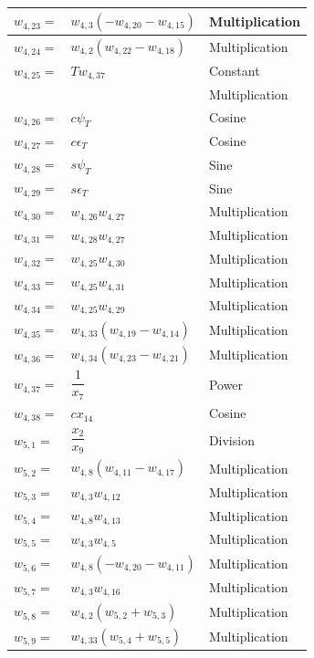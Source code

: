\begin{longtable}{|p{1.5cm}|l|p{2cm}|}
$w_{4,23}=$ & $ w_{4,3}\left(-w_{4,20}-w_{4,15}\right) $ &  Multiplication \\ \hline
$w_{4,24}=$ & $ w_{4,2}\left(w_{4,22}-w_{4,18}\right) $ &  Multiplication \\ \hline
$w_{4,25}=$  & $ T w_{4,37} $ & Constant  \\ 
& & Multiplication \\ \hline
$w_{4,26}=$  & $ c\psi_{T}  $ & Cosine  \\ \hline
$w_{4,27}=$  & $ c\epsilon_{T}  $ & Cosine  \\ \hline
$w_{4,28}=$  & $ s\psi_{T}  $ & Sine  \\ \hline
$w_{4,29}=$  & $ s\epsilon_{T}  $ & Sine  \\ \hline
$w_{4,30}=$ & $ w_{4,26}w_{4,27} $ &  Multiplication \\ \hline
$w_{4,31}=$ & $ w_{4,28}w_{4,27} $ &  Multiplication \\ \hline
$w_{4,32}=$ & $ w_{4,25}w_{4,30} $ &  Multiplication \\ \hline
$w_{4,33}=$ & $ w_{4,25}w_{4,31} $ &  Multiplication \\ \hline
$w_{4,34}=$ & $ w_{4,25}w_{4,29} $ &  Multiplication \\ \hline
$w_{4,35}=$ & $ w_{4,33}\left(w_{4,19}-w_{4,14}\right) $ &  Multiplication \\ \hline
$w_{4,36}=$ & $ w_{4,34}\left(w_{4,23}-w_{4,21}\right) $ &  Multiplication \\ \hline
$w_{4,37}=$  & $ \dfrac{1}{x_{7}} $ & Power \\ \hline
$w_{4,38}=$  & $ cx_{14}  $ & Cosine  \\ \hline
$w_{5,1}=$ & $ \dfrac{x_{2}}{x_{9}} $ & Division  \\ \hline
$w_{5,2}=$ & $ w_{4,8}\left(w_{4,11}-w_{4,17}\right) $ & Multiplication  \\ \hline
$w_{5,3}=$ & $ w_{4,3}w_{4,12} $ & Multiplication \\ \hline
$w_{5,4}=$ & $ w_{4,8}w_{4,13} $ & Multiplication  \\ \hline
$w_{5,5}=$ & $ w_{4,3}w_{4,5} $ &  Multiplication  \\ \hline
$w_{5,6}=$ & $ w_{4,8}\left(-w_{4,20}-w_{4,11}\right) $ &  Multiplication  \\ \hline
$w_{5,7}=$ & $ w_{4,3}w_{4,16} $ & Multiplication \\ \hline
$w_{5,8}=$ & $ w_{4,2}\left(w_{5,2}+w_{5,3}\right) $ & Multiplication \\ \hline
$w_{5,9}=$ & $ w_{4,33}\left(w_{5,4}+w_{5,5}\right) $ & Multiplication \\ \hline

\end{longtable}
